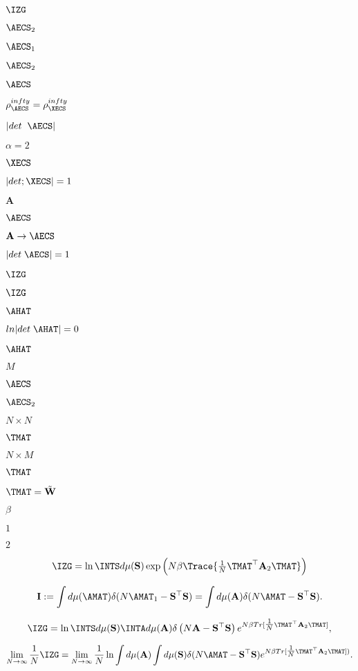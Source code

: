 $\IZG$

$\AECS_{2}$

$\AECS_{1}$

$\AECS_{2}$

$\AECS$

$\rho^{infty}_{\AECS}=\rho^{infty}_{\XECS}$

$|det\;\;\AECS| $

$\alpha=2$

$\XECS$

$|det;\XECS|=1$

$\mathbf{A}$

$\AECS$

$\mathbf{A}\rightarrow\AECS$

$|det\;\AECS|=1$

$\IZG$

$\IZG$

$\AHAT$

$ln|det\;\AHAT|=0$

$\AHAT$

$M$

$\AECS$

$\AECS_{2}$

$N\times N$

$\TMAT$

$N\times M$

$\TMAT$

$\TMAT=\tilde{\mathbf{W}}$

$\beta$

$1$

$2$

\begin{align}
\IZG = \ln\INTS  d\mu(\mathbf{S}) \exp\left(N\beta \Trace{ \tfrac{1}{N}\TMAT^{\top} \mathbf{A}_{2} \TMAT } \right)
\end{align}

\begin{align}
  \label{eqn:I}
  \mathbf{I}:=\int d\mu(\AMAT)\delta(N\AMAT_{1}-\mathbf{S}^{\top}\mathbf{S})=\int d\mu(\mathbf{A})\delta(N\AMAT-\mathbf{S}^{\top}\mathbf{S})  .
\end{align}

\begin{align}
\label{eqn:IZG_3}
\IZG= \ln \INTS d\mu(\mathbf{S})\INTA d\mu(\mathbf{A})
           \delta\left( N\mathbf{A}-\mathbf{S}^{\top}\mathbf{S} \right) 
           e^{ N\beta Tr[\tfrac{1}{N} \TMAT^{\top} \mathbf{A}_{2}\TMAT ] } ,
\end{align}

\begin{align}
  \label{eqn:IZG_4}
  \lim_{N\rightarrow\infty}\frac{1}{N}\IZG =
  \lim_{N\rightarrow\infty}\frac{1}{N} \ln
  \int d\mu(\mathbf{A})
  \int d\mu(\mathbf{S})
  \delta(N\AMAT-\mathbf{S}^{\top}\mathbf{S})
  e^{ N\beta Tr[ \tfrac{1}{N}\TMAT^{\top}\mathbf{A}_{2}\TMAT]) }  .
\end{align}

